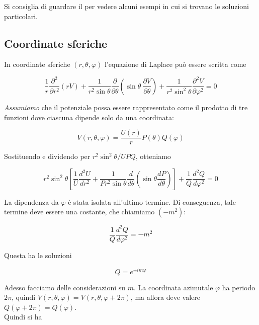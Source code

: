 Si consiglia di guardare il \cite{ElettrodinamicaClassica}
per vedere alcuni esempi in cui si trovano le soluzioni particolari. 

\newpage

\subsection{Coordinate sferiche}

In coordinate sferiche $(r, \theta, \varphi)$ l'equazione di Laplace può essere scritta come 

\begin{equation}
    \frac{1}{r} \frac{\partial^2}{\partial r^2} (rV) + \frac{1}{r^2 \sin \theta} \frac{\partial}{\partial \theta} \left ( \sin \theta \ \frac{\partial V}{\partial \theta} \right ) + \frac{1}{r^2 \sin ^2 \theta} \frac{\partial^2 V}{\partial \varphi^2} = 0
\end{equation}

\emph{Assumiamo} che il potenziale possa essere rappresentato come il prodotto di tre funzioni dove ciascuna dipende solo da una coordinata:

\begin{equation}
    V(r, \theta, \varphi) = \frac{U(r)}{r} P(\theta) Q(\varphi)
\end{equation}

Sostituendo e dividendo per $r^2 \sin ^2 \theta /UPQ$, otteniamo 

\begin{equation}
    r^2 \sin ^2 \theta \left [ \frac{1}{U}\frac{d^2U}{dr^2} + \frac{1}{P r^2 \sin \theta} \frac{d}{d \theta} \left( \sin \theta \frac{dP}{d \theta}\right) \right] + \frac{1}{Q}\frac{d^2 Q}{d \varphi ^2} = 0
    \label{eq:7.19}
\end{equation}

La dipendenza da $\varphi$ è stata isolata all'ultimo termine. Di conseguenza, tale termine deve essere una costante, che chiamiamo $(- m^2)$:

\begin{equation}
    \frac{1}{Q} \frac{d^2 Q}{d \varphi^2} = - m^2
\end{equation}

Questa ha le soluzioni 

\begin{equation}
    Q = e^{\pm i m \varphi}
\end{equation}

Adesso facciamo delle considerazioni su $m$. La coordinata azimutale $\varphi$ ha periodo $2\pi$, quindi $V(r, \theta, \varphi) = V(r, \theta, \varphi + 2\pi)$, ma allora deve valere $Q(\varphi + 2 \pi) = Q(\varphi) $.\\ 
Quindi si ha 

